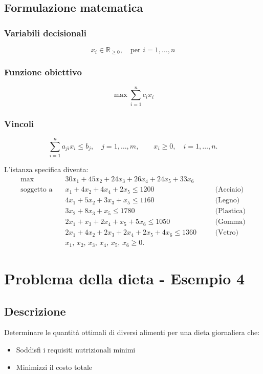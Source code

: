 \subsection{Formulazione matematica}

\subsubsection{Variabili decisionali}
\[
x_i \in \mathbb{R}_{\geq 0}, \quad \text{per } i = 1, \dots, n
\]

\subsubsection{Funzione obiettivo}
\[
\max \sum_{i=1}^{n} c_i x_i
\]

\subsubsection{Vincoli}
\[
\sum_{i=1}^{n} a_{ji} x_i \leq b_j,\quad j = 1, \dots, m,\qquad x_i \geq 0, \quad i = 1, \dots, n.
\]

L'istanza specifica diventa:
\begin{align}
\max \quad & 30x_1 + 45x_2 + 24x_3 + 26x_4 + 24x_5 + 33x_6 \\[1mm]
\text{soggetto a} \quad
& x_1 + 4x_2 + 4x_4 + 2x_5 \leq 1200 \quad && \text{(Acciaio)} \\
& 4x_1 + 5x_2 + 3x_3 + x_5 \leq 1160 \quad && \text{(Legno)} \\
& 3x_2 + 8x_3 + x_5 \leq 1780 \quad && \text{(Plastica)} \\
& 2x_1 + x_3 + 2x_4 + x_5 + 5x_6 \leq 1050 \quad && \text{(Gomma)} \\
& 2x_1 + 4x_2 + 2x_3 + 2x_4 + 2x_5 + 4x_6 \leq 1360 \quad && \text{(Vetro)} \\
& x_1,\, x_2,\, x_3,\, x_4,\, x_5,\, x_6 \geq 0.
\end{align}

\section{Problema della dieta - Esempio 4}

\subsection{Descrizione}
Determinare le quantità ottimali di diversi alimenti per una dieta giornaliera che:
\begin{itemize}
    \item Soddisfi i requisiti nutrizionali minimi
    \item Minimizzi il costo totale
\end{itemize}

